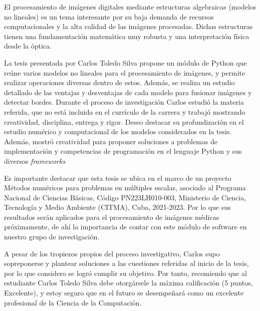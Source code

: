 \begin{opinion}
    El procesamiento de imágenes digitales mediante estructuras algebraicas (modelos no lineales) es un tema interesante por su baja demanda de recursos computacionales y la alta calidad de las imágenes procesadas. Dichas estructuras tienen una fundamentación matemática muy robusta y una interpretación física desde la óptica.
    
    La tesis presentada por Carlos Toledo Silva propone un módulo de Python que reúne varios modelos no lineales para el procesamiento de imágenes, y permite realizar operaciones diversas dentro de estos. Además, se realiza un estudio detallado de las ventajas y desventajas de cada modelo para fusionar imágenes y detectar bordes. Durante el proceso de investigación Carlos estudió la materia referida, que no está incluida en el currículo de la carrera y trabajó mostrando creatividad, disciplina, entrega y rigor. Deseo destacar su profundización en el estudio numérico y computacional de los modelos considerados en la tesis. Además, mostró creatividad para proponer soluciones a problemas de implementación y competencias de programación en el lenguaje Python y sus diversos \textit{frameworks}
    
    Es importante destacar que esta tesis se ubica en el marco de un proyecto Métodos numéricos para problemas en múltiples escalas, asociado al Programa Nacional de Ciencias Básicas, Código PN223LH010-003, Ministerio de Ciencia, Tecnología y Medio Ambiente (CITMA), Cuba, 2021-2023. Por lo que sus resultados serán aplicados para el procesamiento de imágenes médicas próximamente, de ahí la importancia de contar con este módulo de software en nuestro grupo de investigación.
    
    A pesar de los tropiezos propios del proceso investigativo, Carlos supo sopreponerse y plantear soluciones a las cuestiones referidas al inicio de la tesis, por lo que considero se logró cumplir su objetivo.
    Por tanto, recomiendo que al estudiante Carlos Toledo Silva debe otorgársele la máxima calificación (5 puntos, Excelente), y estoy seguro que en el futuro se desempeñará como un excelente profesional de la Ciencia de la Computación.
\end{opinion}